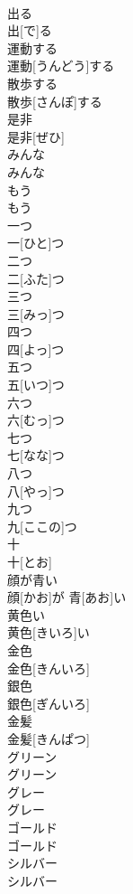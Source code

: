 \documentclass[8pt]{extreport}
\begin{document}
\begin{CJK}{UTF8}{min}
\\	出る	
\\	出[で]る
\\	運動する	
\\	運動[うんどう]する
\\	散歩する	
\\	散歩[さんぽ]する
\\	是非	
\\	是非[ぜひ]
\\	みんな	
\\	みんな
\\	もう	
\\	もう
\\	一つ	
\\	一[ひと]つ
\\	二つ	
\\	二[ふた]つ
\\	三つ	
\\	三[みっ]つ
\\	四つ	
\\	四[よっ]つ
\\	五つ	
\\	五[いつ]つ
\\	六つ	
\\	六[むっ]つ
\\	七つ	
\\	七[なな]つ
\\	八つ	
\\	八[やっ]つ
\\	九つ	
\\	九[ここの]つ
\\	十	
\\	十[とお]
\\	顔が青い	
\\	顔[かお]が 青[あお]い
\\	黄色い	
\\	黄色[きいろ]い
\\	金色	
\\	金色[きんいろ]
\\	銀色	
\\	銀色[ぎんいろ]
\\	金髪	
\\	金髪[きんぱつ]
\\	グリーン	
\\	グリーン
\\	グレー	
\\	グレー
\\	ゴールド	
\\	ゴールド
\\	シルバー	
\\	シルバー

\end{CJK}
\end{document}
